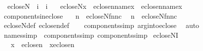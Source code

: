 \begin{isabellebody}
\isanewline
{}\isamarkupfalse%
\isanewline
\ \ ecloseN\ {\isacharcolon}{\kern0pt}{\isacharcolon}{\kern0pt}\ {\isachardoublequoteopen}i\ {\isasymRightarrow}\ i{\isachardoublequoteclose}\ \isanewline
\ \ {\isachardoublequoteopen}ecloseN{\isacharparenleft}{\kern0pt}x{\isacharparenright}{\kern0pt}\ {\isacharequal}{\kern0pt}\ eclose{\isacharunderscore}{\kern0pt}n{\isacharparenleft}{\kern0pt}name{}{\isacharcomma}{\kern0pt}x{\isacharparenright}{\kern0pt}\ {\isasymunion}\ eclose{\isacharunderscore}{\kern0pt}n{\isacharparenleft}{\kern0pt}name{}{\isacharcomma}{\kern0pt}x{\isacharparenright}{\kern0pt}{\isachardoublequoteclose}\isanewline
\isanewline
{}\isamarkupfalse%
\ components{\isacharunderscore}{\kern0pt}in{\isacharunderscore}{\kern0pt}eclose\ {\isacharcolon}{\kern0pt}\isanewline
\ \ {\isachardoublequoteopen}n{}\ {\isasymin}\ ecloseN{\isacharparenleft}{\kern0pt}{\isasymlangle}f{\isacharcomma}{\kern0pt}n{}{\isacharcomma}{\kern0pt}n{}{\isacharcomma}{\kern0pt}c{\isasymrangle}{\isacharparenright}{\kern0pt}{\isachardoublequoteclose}\isanewline
\ \ {\isachardoublequoteopen}n{}\ {\isasymin}\ ecloseN{\isacharparenleft}{\kern0pt}{\isasymlangle}f{\isacharcomma}{\kern0pt}n{}{\isacharcomma}{\kern0pt}n{}{\isacharcomma}{\kern0pt}c{\isasymrangle}{\isacharparenright}{\kern0pt}{\isachardoublequoteclose}\isanewline
%
\isadelimproof
\ \ %
\endisadelimproof
%
\isatagproof
{}\isamarkupfalse%
\ ecloseN{\isacharunderscore}{\kern0pt}def\ eclose{\isacharunderscore}{\kern0pt}n{\isacharunderscore}{\kern0pt}def\isanewline
\ \ \isamarkupfalse%
\ components{\isacharunderscore}{\kern0pt}simp\ arg{\isacharunderscore}{\kern0pt}into{\isacharunderscore}{\kern0pt}eclose\ \isamarkupfalse%
\ auto%
\endisatagproof
{\isafoldproof}%
%
\isadelimproof
\isanewline
%
\endisadelimproof
\isanewline
{}\isamarkupfalse%
\ names{\isacharunderscore}{\kern0pt}simp\ {\isacharequal}{\kern0pt}\ components{\isacharunderscore}{\kern0pt}simp{\isacharparenleft}{\kern0pt}{}{\isacharparenright}{\kern0pt}\ components{\isacharunderscore}{\kern0pt}simp{\isacharparenleft}{\kern0pt}{}{\isacharparenright}{\kern0pt}\isanewline
\isanewline
{}\isamarkupfalse%
\ ecloseNI{}\ {\isacharcolon}{\kern0pt}\ \isanewline
\ \ \ {\isachardoublequoteopen}x\ {\isasymin}\ eclose{\isacharparenleft}{\kern0pt}n{}{\isacharparenright}{\kern0pt}\ {\isasymor}\ x{\isasymin}eclose{\isacharparenleft}{\kern0pt}n{}{\isacharparenright}{\kern0pt}{\isachardoublequoteclose}\ \isanewline

\end{isabellebody}
